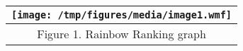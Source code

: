 \begin{longtable}[]{@{}c@{}}
\toprule
\texttt{[image: /tmp/figures/media/image1.wmf]}\tabularnewline
\midrule
\endhead
\protect\hypertarget{_Ref477537941}{}{\protect\hypertarget{_Ref477537937}{}{}}Figure
1. Rainbow Ranking graph\tabularnewline
\bottomrule

\end{longtable}